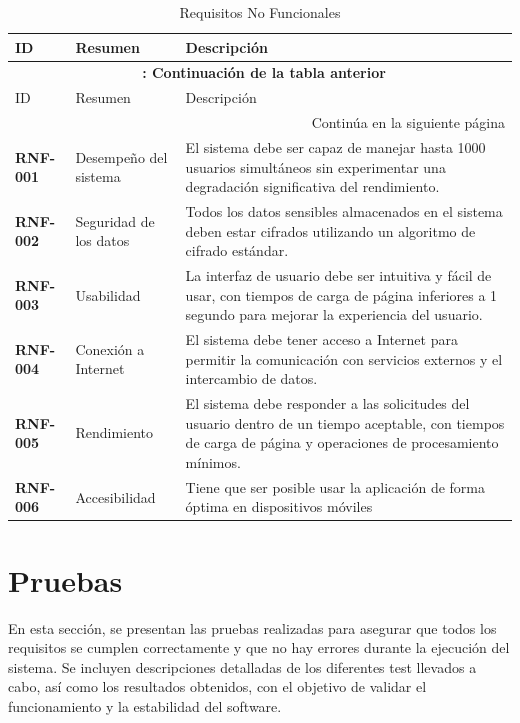     \begin{longtable}{ p{2.5cm} p{4cm} p{9cm} }
        \caption{Requisitos No Funcionales} \label{tabla:RNF} \\
        \hline
        ID & Resumen & Descripción \\
        \hline
        \endfirsthead
        \multicolumn{3}{c}{{\bfseries \tablename\ \thetable{}: Continuación de la tabla anterior}} \\
        \hline
        ID & Resumen & Descripción \\
        \hline
        \endhead
        \hline \multicolumn{3}{|r|}{{Continúa en la siguiente página}} \\ \hline
        \endfoot
        \hline
        \endlastfoot
        \textbf{RNF-001} & Desempeño del sistema & El sistema debe ser capaz de manejar hasta 1000 usuarios simultáneos sin experimentar una degradación 
        significativa del rendimiento. \\
        \textbf{RNF-002} & Seguridad de los datos & Todos los datos sensibles almacenados en el sistema deben estar cifrados utilizando un algoritmo de cifrado 
        estándar. \\
        \textbf{RNF-003} & Usabilidad & La interfaz de usuario debe ser intuitiva y fácil de usar, con tiempos de carga de página inferiores a 1 segundo para 
        mejorar la experiencia del usuario. \\
        \textbf{RNF-004} &  Conexión a Internet & El sistema debe tener acceso a Internet para permitir la comunicación con servicios externos y el intercambio
         de datos. \\
        \textbf{RNF-005} & Rendimiento & El sistema debe responder a las solicitudes del usuario dentro de un tiempo aceptable, con tiempos de carga de página y
         operaciones de procesamiento mínimos. \\
        \textbf{RNF-006} & Accesibilidad & Tiene que ser posible usar la aplicación de forma óptima en dispositivos móviles\\ 
    \end{longtable}

\section{Pruebas}
En esta sección, se presentan las pruebas realizadas para asegurar que todos los requisitos se cumplen correctamente y que no hay errores durante la ejecución del 
sistema. Se incluyen descripciones detalladas de los diferentes test llevados a cabo, así como los resultados obtenidos, con el objetivo de validar el 
funcionamiento y la estabilidad del software.


